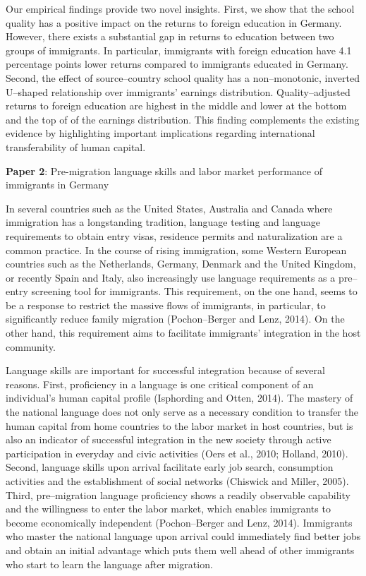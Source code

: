 \documentclass[a4paper, 11pt]{article} %
\begin{document}
Our empirical findings provide two novel insights. First, we show that the school quality has a positive impact on the returns to foreign education in Germany. However, there exists a substantial gap in returns to education between two groups of immigrants. In particular, immigrants with foreign education have 4.1 percentage points lower returns compared to immigrants educated in Germany. Second, the effect of source--country school quality has a non--monotonic, inverted U--shaped relationship over immigrants' earnings distribution. Quality--adjusted returns to foreign education are highest in the middle and lower at the bottom and the top of of the earnings distribution. This finding complements the existing evidence by highlighting important implications regarding international transferability of human capital.

\vspace{15pt}

\textbf{Paper 2}: Pre-migration language skills and labor market performance of immigrants in Germany

\vspace{15pt}

In several countries such as the United States, Australia and Canada where immigration has a longstanding tradition, language testing and language requirements to obtain entry visas, residence permits and naturalization are a common practice. In the course of rising immigration, some Western European countries such as the Netherlands, Germany, Denmark and the United Kingdom, or recently Spain and Italy, also increasingly use language requirements as a pre--entry screening tool for immigrants. This requirement, on the one hand, seems to be a response to restrict the massive flows of immigrants, in particular, to significantly reduce family migration (Pochon--Berger and Lenz, 2014). On the other hand, this requirement aims to facilitate immigrants' integration in the host community.

Language skills are important for successful integration because of several reasons. First, proficiency in a language is one critical component of an individual's human capital profile (Isphording and Otten, 2014). The mastery of the national language does not only serve as a necessary condition to transfer the human capital from home countries to the labor market in host countries, but is also an indicator of successful integration in the new society through active participation in everyday and civic activities (Oers et al., 2010; Holland, 2010). Second, language skills upon arrival facilitate early job search, consumption activities and the establishment of social networks (Chiswick and Miller, 2005). Third, pre--migration language proficiency shows a readily observable capability and the willingness to enter the labor market, which enables immigrants to become economically independent (Pochon--Berger and Lenz, 2014). Immigrants who master the national language upon arrival could immediately find better jobs and obtain an initial advantage which puts them well ahead of other immigrants who start to learn the language after migration.
\end{document}
